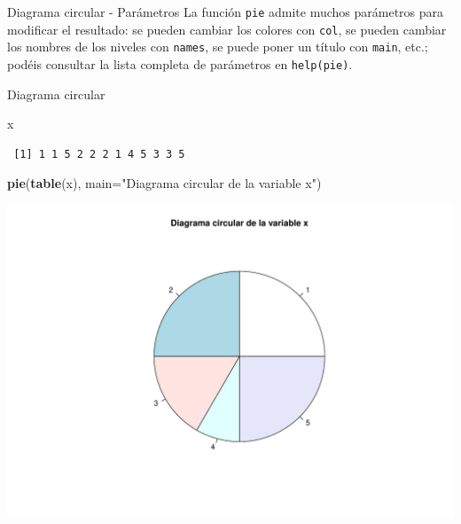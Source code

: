 \documentclass[
  ignorenonframetext,
]{beamer}
\newenvironment{Shaded}{\begin{snugshade}}{\end{snugshade}}
\newcommand{\AttributeTok}[1]{\textcolor[rgb]{0.13,0.29,0.53}{#1}}
\newcommand{\FunctionTok}[1]{\textcolor[rgb]{0.13,0.29,0.53}{\textbf{#1}}}
\newcommand{\NormalTok}[1]{#1}
\newcommand{\StringTok}[1]{\textcolor[rgb]{0.31,0.60,0.02}{#1}}
\begin{document}
\begin{frame}[fragile]{Diagrama circular - Parámetros}
\label{diagrama-circular---paruxe1metros}
La función \texttt{pie} admite muchos parámetros para modificar el
resultado: se pueden cambiar los colores con \texttt{col}, se pueden
cambiar los nombres de los niveles con \texttt{names}, se puede poner un
título con \texttt{main}, etc.; podéis consultar la lista completa de
parámetros en \texttt{help(pie)}.
\end{frame}

\begin{frame}[fragile]{Diagrama circular}
\label{diagrama-circular-1}
\begin{Shaded}
\begin{Highlighting}[]
\NormalTok{x}
\end{Highlighting}
\end{Shaded}

\begin{verbatim}
 [1] 1 1 5 2 2 2 1 4 5 3 3 5
\end{verbatim}

\begin{Shaded}
\begin{Highlighting}[]
\FunctionTok{pie}\NormalTok{(}\FunctionTok{table}\NormalTok{(x), }\AttributeTok{main=}\StringTok{"Diagrama circular de la variable x"}\NormalTok{)}
\end{Highlighting}
\end{Shaded}

\includegraphics{R_base_files/figure-beamer/unnamed-chunk-92-1.pdf}
\end{frame}
\end{document}
